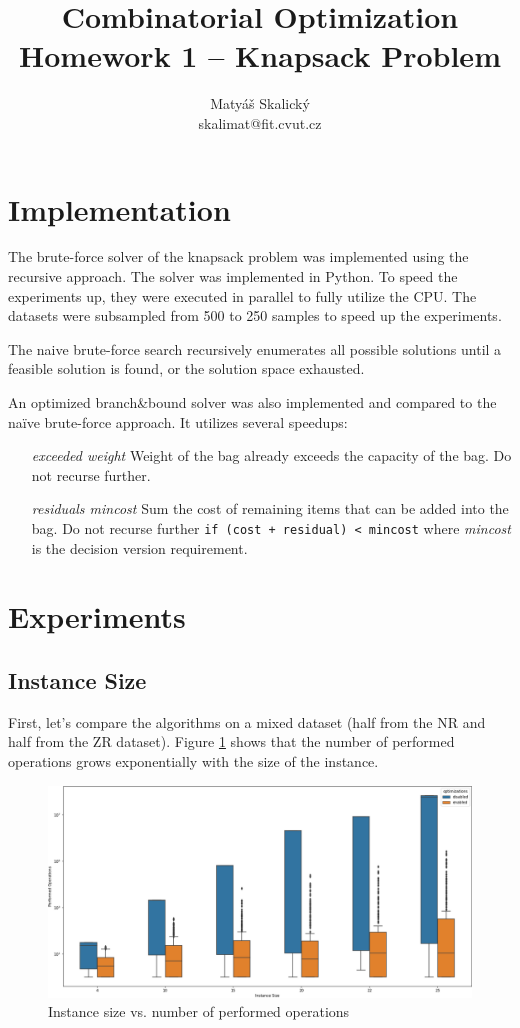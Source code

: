 \documentclass[a4paper,10pt]{article}
\title{Combinatorial Optimization\\Homework 1 – Knapsack Problem}
\author{Matyáš Skalický\\skalimat@fit.cvut.cz}
\begin{document}
\maketitle
\tableofcontents
\medskip


\section{Implementation}
The brute-force solver of the knapsack problem was implemented using the recursive approach. The solver was implemented in Python. To speed the experiments up, they were executed in parallel to fully utilize the CPU. The datasets were subsampled from 500 to 250 samples to speed up the experiments.

The naive brute-force search recursively enumerates all possible solutions until a feasible solution is found, or the solution space exhausted.

An optimized branch\&bound solver was also implemented and compared to the naïve brute-force approach. It utilizes several speedups:

\begin{enumerate}[leftmargin=1in]
	\item[\emph{exceeded weight}] Weight of the bag already exceeds the capacity of the bag. Do not recurse further.
	\item[\emph{residuals mincost}] Sum the cost of remaining items that can be added into the bag. Do not recurse further \lstinline{if (cost + residual) < mincost} where \emph{mincost} is the decision version requirement.
\end{enumerate}

\clearpage

\section{Experiments}
\subsection{Instance Size}
First, let's compare the algorithms on a mixed dataset (half from the NR and half from the ZR dataset). Figure \ref{size_vs_ops_boxplot} shows that the number of performed operations grows exponentially with the size of the instance.

\begin{figure}[!htb]
	\centering
  	\includegraphics[width=\textwidth]{size_vs_performed_boxplot.png}
	\caption{Instance size vs. number of performed operations}
	\label{size_vs_ops_boxplot}
\end{figure}
\end{document}
